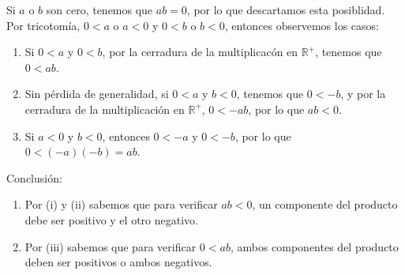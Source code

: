 \documentclass[11pt]{article}
\newcommand{\R}{\mathbb{R}}
\begin{document}
\begin{enumerate}[label=\alph*)]
    Si $a$ o $b$ son cero, tenemos que $ab=0$, por lo que descartamos esta posiblidad. Por tricotomía, $0<a$ o $a<0$ y $0<b$ o $b<0$, entonces observemos los casos:
    \begin{enumerate}[label=\roman*)]
        \item Si $0<a$ y $0<b$, por la cerradura de la multiplicacón en $\R^+$, tenemos que $0<ab$.
        \item Sin pérdida de generalidad, si $0<a$ y $b<0$, tenemos que $0<-b$, y por la cerradura de la multiplicación en $\R^+$, $0<-ab$, por lo que $ab<0$.
        \item Si $a<0$ y $b<0$, entonces $0<-a$ y $0<-b$, por lo que $0<(-a)(-b)=ab$.
    \end{enumerate}
    Conclusión:
    \begin{enumerate}[label=\arabic*)]
        \item Por (i) y (ii) sabemos que para verificar $ab<0$, un componente del producto debe ser positivo y el otro negativo.
        \item Por (iii) sabemos que para verificar $0<ab$, ambos componentes del producto deben ser positivos o ambos negativos.
    \end{enumerate}


\end{enumerate}
\end{document}
